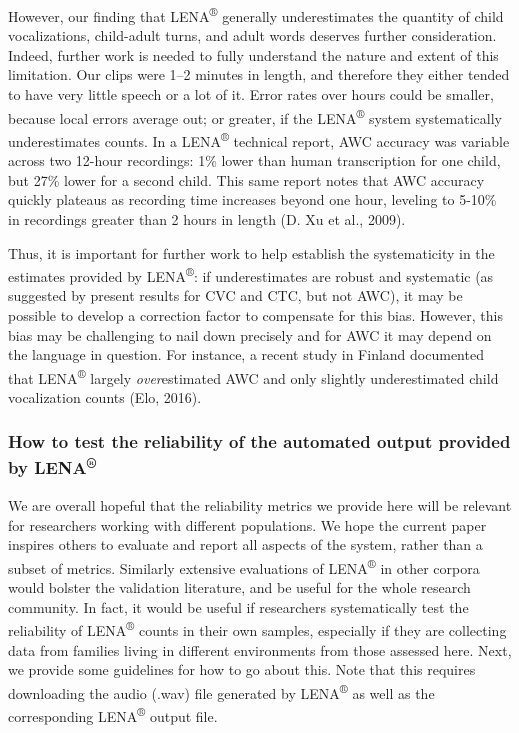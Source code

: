 \documentclass[english,table,man,floatsintext]{apa6}
\begin{document}
However, our finding that LENA\textsuperscript{®} generally
underestimates the quantity of child vocalizations, child-adult turns,
and adult words deserves further consideration. Indeed, further work is
needed to fully understand the nature and extent of this limitation. Our
clips were 1--2 minutes in length, and therefore they either tended to
have very little speech or a lot of it. Error rates over hours could be
smaller, because local errors average out; or greater, if the
LENA\textsuperscript{®} system systematically underestimates counts. In
a LENA\textsuperscript{®} technical report, AWC accuracy was variable
across two 12-hour recordings: 1\% lower than human transcription for
one child, but 27\% lower for a second child. This same report notes
that AWC accuracy quickly plateaus as recording time increases beyond
one hour, leveling to 5-10\% in recordings greater than 2 hours in
length (D. Xu et al., 2009).

Thus, it is important for further work to help establish the
systematicity in the estimates provided by LENA\textsuperscript{®}: if
underestimates are robust and systematic (as suggested by present
results for CVC and CTC, but not AWC), it may be possible to develop a
correction factor to compensate for this bias. However, this bias may be
challenging to nail down precisely and for AWC it may depend on the
language in question. For instance, a recent study in Finland documented
that LENA\textsuperscript{®} largely \emph{over}estimated AWC and only
slightly underestimated child vocalization counts (Elo, 2016).

\subsubsection{\texorpdfstring{How to test the reliability of the
automated output provided by
LENA\textsuperscript{®}}{How to test the reliability of the automated output provided by LENA®}}\label{how-to-test-the-reliability-of-the-automated-output-provided-by-lena}

We are overall hopeful that the reliability metrics we provide here will
be relevant for researchers working with different populations. We hope
the current paper inspires others to evaluate and report all aspects of
the system, rather than a subset of metrics. Similarly extensive
evaluations of LENA\textsuperscript{®} in other corpora would bolster
the validation literature, and be useful for the whole research
community. In fact, it would be useful if researchers systematically
test the reliability of LENA\textsuperscript{®} counts in their own
samples, especially if they are collecting data from families living in
different environments from those assessed here. Next, we provide some
guidelines for how to go about this. Note that this requires downloading
the audio (.wav) file generated by LENA\textsuperscript{®} as well as
the corresponding LENA\textsuperscript{®} output file.
\end{document}
